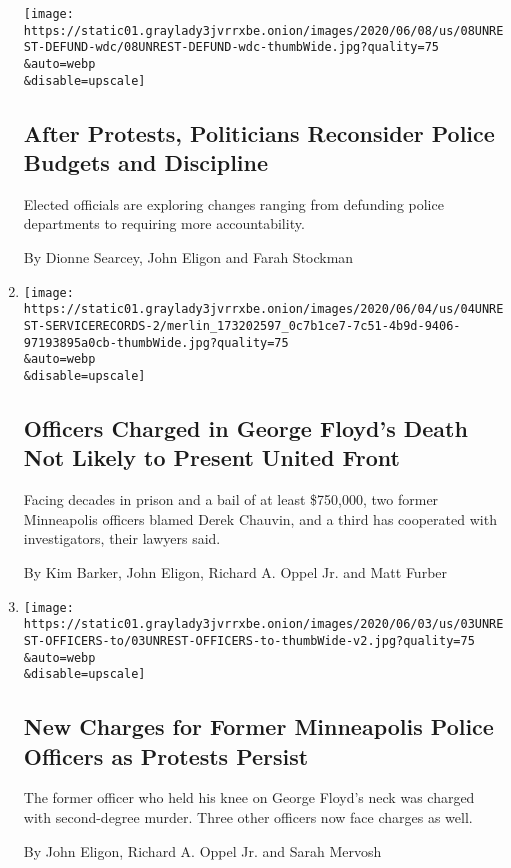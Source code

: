 \begin{enumerate}
  \texttt{[image: https://static01.graylady3jvrrxbe.onion/images/2020/06/08/us/08UNREST-DEFUND-wdc/08UNREST-DEFUND-wdc-thumbWide.jpg?quality=75\\\&auto=webp\\\&disable=upscale]}

  \hypertarget{after-protests-politicians-reconsider-police-budgets-and-discipline}{%
  \subsection{After Protests, Politicians Reconsider Police Budgets and
  Discipline}\label{after-protests-politicians-reconsider-police-budgets-and-discipline}}

  Elected officials are exploring changes ranging from defunding police
  departments to requiring more accountability.

  By Dionne Searcey, John Eligon and Farah Stockman
\item
  \href{/2020/06/04/us/george-floyd-police-records-chauvin.html}{}

  \texttt{[image: https://static01.graylady3jvrrxbe.onion/images/2020/06/04/us/04UNREST-SERVICERECORDS-2/merlin\_173202597\_0c7b1ce7-7c51-4b9d-9406-97193895a0cb-thumbWide.jpg?quality=75\\\&auto=webp\\\&disable=upscale]}

  \hypertarget{officers-charged-in-george-floyds-death-not-likely-to-present-united-front}{%
  \subsection{Officers Charged in George Floyd's Death Not Likely to
  Present United
  Front}\label{officers-charged-in-george-floyds-death-not-likely-to-present-united-front}}

  Facing decades in prison and a bail of at least \$750,000, two former
  Minneapolis officers blamed Derek Chauvin, and a third has cooperated
  with investigators, their lawyers said.

  By Kim Barker, John Eligon, Richard A. Oppel Jr. and Matt Furber
\item
  \href{/2020/06/03/us/george-floyd-officers-charged.html}{}

  \texttt{[image: https://static01.graylady3jvrrxbe.onion/images/2020/06/03/us/03UNREST-OFFICERS-to/03UNREST-OFFICERS-to-thumbWide-v2.jpg?quality=75\\\&auto=webp\\\&disable=upscale]}

  \hypertarget{new-charges-for-former-minneapolis-police-officers-as-protests-persist}{%
  \subsection{New Charges for Former Minneapolis Police Officers as
  Protests
  Persist}\label{new-charges-for-former-minneapolis-police-officers-as-protests-persist}}

  The former officer who held his knee on George Floyd's neck was
  charged with second-degree murder. Three other officers now face
  charges as well.

  By John Eligon, Richard A. Oppel Jr. and Sarah Mervosh
\end{enumerate}

